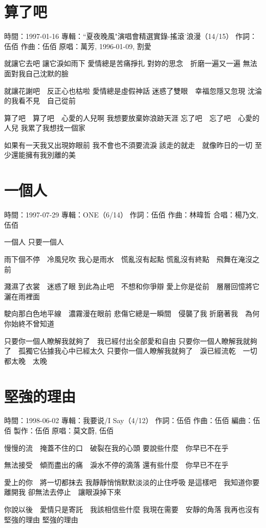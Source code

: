 \documentclass[UTF8,a4paper,oneside,twocolumn,12pt]{ctexbook}
\newcommand{\infopair}[2]{\textbullet #1：#2}
\newcommand{\zc}[1][伍佰]{\infopair{作詞}{#1}}
\newcommand{\zq}[1][伍佰]{\infopair{作曲}{#1}}
\newcommand{\bq}[1][伍佰]{\infopair{編曲}{#1}}
\newcommand{\zj}[1]{\infopair{專輯}{#1}}
\newcommand{\zz}[1]{\infopair{製作}{#1}}
\newcommand{\yc}[1]{\infopair{原唱}{#1}}
\newcommand{\sj}[1]{\infopair{時間}{#1}}
\newenvironment{info}{\begin{flushleft}\kaishu
	}
	{\end{flushleft}\normalsize\yahei\par}
\newenvironment{lyric}{
	}
{}
\begin{document}
\section{算了吧}
\begin{info}
	\sj{1997-01-16}
	\zj{``夏夜晚風"演唱會精選實錄-搖滾˙浪漫（14/15）}
	\zc
	\zq
	\yc{萬芳, 1996-01-09, 割愛}
\end{info}
\begin{lyric}
	就讓它去吧 讓它淚如雨下
	愛情總是苦痛掙扎
	對妳的思念　折磨一遍又一遍
	無法面對我自己沈默的臉

	就讓花謝吧　反正心也枯啦
	愛情總是虛假神話
	迷惑了雙眼　幸福忽隱又忽現
	沈淪的我看不見　自己從前

	算了吧　算了吧　心愛的人兒啊
	我想要放棄妳浪跡天涯
	忘了吧　忘了吧　心愛的人兒
	我累了我想找一個家

	如果有一天我又出現妳眼前
	我不會也不須要流淚
	該走的就走　就像昨日的一切
	至少還能擁有我別離的美
\end{lyric}

\section{一個人}
\begin{info}
	\sj{1997-07-29}
	\zj{ONE（6/14）}
	\zc
	\zq[林暐哲]
	\infopair{合唱}{楊乃文, 伍佰}
\end{info}
\begin{lyric}
	一個人 只要一個人

	雨下個不停　冷風兒吹
	我心是雨水　慌亂沒有起點
	慌亂沒有終點　飛舞在淹沒之前

	濺濕了衣裳　迷惑了眼
	到此為止吧　不想和你爭辯
	愛上你是從前　層層回憶將它灑在雨裡面

	駛向那白色地平線　濃霧漫在眼前
	悲傷它總是一瞬間　侵襲了我
	折磨著我　為何你始終不曾知道

	只要你一個人瞭解我就夠了　我已經付出全部愛和自由
	只要你一個人瞭解我就夠了　孤獨它佔據我心中已經太久
	只要你一個人瞭解我就夠了　淚已經流乾　一切都太晚　太晚
\end{lyric}

\section{堅強的理由}
\begin{info}
	\sj{1998-06-02}
	\zj{我要说/I Say（4/12）}
	\zc
	\zq
	\bq[伍佰]
	\zz{伍佰}
	\infopair{原唱}{莫文蔚, 伍佰}
\end{info}
\begin{lyric}
	慢慢的流　掩蓋不住的口　破裂在我的心頭
	要說些什麼　你早已不在乎

	無法接受　傾而盡出的痛　淚水不停的滴落
	還有些什麼　你早已不在乎

	愛上的你　將一切都抹去
	我靜靜悄悄默默淡淡的止住呼吸
	是這樣吧　我知道你要離開我
	卻無法去停止　讓眼淚掉下來

	你說以後　愛情只是寄託　我該相信些什麼
	我現在需要　安靜的角落
	我再也沒有　堅強的理由
	堅強的理由
\end{lyric}
\end{document}
